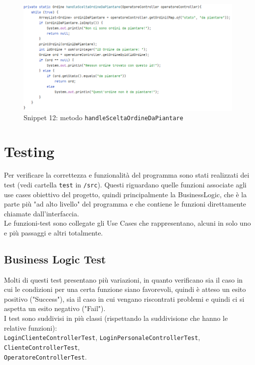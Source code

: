 \documentclass{article}
\newcommand{\code}[1]{\texttt{#1}}
\begin{document}
\begin{figure}[H]
    \centering
    \includegraphics[scale=0.5]{resources/images/Snippets/snippet_handlesceltaordinedapiantare.png}
    \captionsetup{labelformat=empty,labelsep=none}
    \caption{Snippet 12: metodo \code{handleSceltaOrdineDaPiantare}}
    \label{fig:snippet_handlesceltaordinedapiantare}
\end{figure}


\section{Testing}
Per verificare la correttezza e funzionalità del programma sono stati realizzati dei test (vedi cartella \code{test} in \code{/src}). Questi riguardano quelle funzioni associate agli use cases obiettivo del progetto, quindi principalmente la BusinessLogic, che è la parte più "ad alto livello" del programma e che contiene le funzioni direttamente chiamate dall'interfaccia. \\

\noindent Le funzioni-test sono collegate gli Use Cases che rappresentano, alcuni in solo uno e più passaggi e altri totalmente.\\


\subsection{Business Logic Test}
Molti di questi test presentano più variazioni, in quanto verificano sia il caso in cui le condizioni per una certa funzione siano favorevoli, quindi è atteso un esito positivo ("Success"), sia il caso in cui vengano riscontrati problemi e quindi ci si aspetta un esito negativo ("Fail").\\

\noindent I test sono suddivisi in più classi (rispettando la suddivisione che hanno le relative funzioni): \\
\code{LoginClienteControllerTest}, \code{LoginPersonaleControllerTest}, 
\code{ClienteControllerTest},\\ 
\code{OperatoreControllerTest}.
\end{document}
